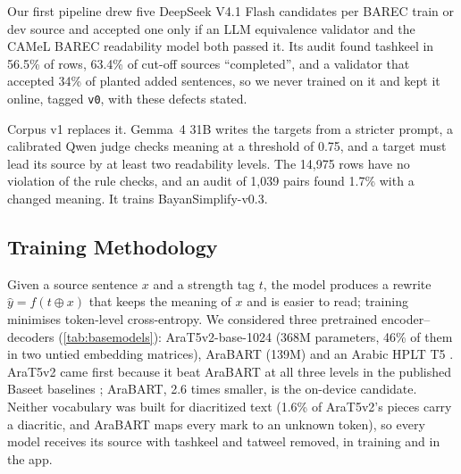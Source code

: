\documentclass[10pt,a4paper]{article}
\newcommand{\vThree}{BayanSimplify-v0.3}
\begin{document}
 Our first pipeline drew five DeepSeek V4.1 Flash
candidates per BAREC train or dev source and accepted one only if an LLM
equivalence validator and the CAMeL BAREC readability model both passed it. Its
audit found tashkeel in 56.5\% of rows, 63.4\% of cut-off sources ``completed'',
and a validator that accepted 34\% of planted added sentences, so we never
trained on it and kept it online, tagged \texttt{v0}, with these defects stated.

 Corpus v1 replaces it. Gemma~4 31B writes the
targets from a stricter prompt, a calibrated Qwen judge checks meaning at a
threshold of 0.75, and a target must lead its source by at least two readability
levels. The 14,975 rows have no violation of the rule checks, and an audit of
1,039 pairs found 1.7\% with a changed meaning. It trains \vThree{}.

\subsection{Training Methodology}
\label{sec:method}

 Given a source sentence $x$ and a strength tag $t$,
the model produces a rewrite $\hat y = f(t \oplus x)$ that keeps the meaning of
$x$ and is easier to read; training minimises token-level cross-entropy. We
considered three pretrained encoder--decoders (\autoref{tab:basemodels}): AraT5v2-base-1024 \cite{arat5,octopus,t5}
(368M parameters, 46\% of them in two untied embedding matrices), AraBART
\cite{arabart,bart} (139M) and an Arabic HPLT T5 \cite{nort5,hplt}. AraT5v2 came
first because it beat AraBART at all three levels in the published Baseet
baselines \cite{baseet}; AraBART, 2.6 times smaller, is the on-device candidate.
Neither vocabulary was built for diacritized text (1.6\% of AraT5v2's pieces carry
a diacritic, and AraBART maps every mark to an unknown token), so every model
receives its source with tashkeel and tatweel removed, in training and in the app.
\end{document}

